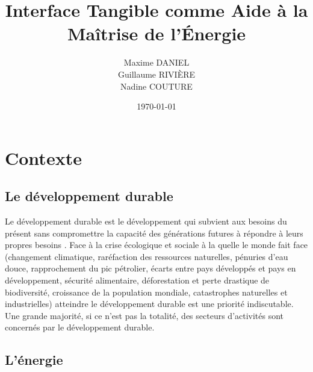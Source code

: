 \documentclass[10pt,a5paper,twoside]{article}
\title{Interface Tangible comme Aide à la Maîtrise de l'Énergie}
\author{Maxime DANIEL\\ Guillaume RIVIÈRE\\ Nadine COUTURE}
\date{\today}
\begin{document}
\maketitle
{}

\clearpage
\tableofcontents
\clearpage
\section{Contexte}\label{contexte}

\subsection{Le développement durable}\label{le-duxe9veloppement-durable}

Le développement durable est le développement qui subvient aux besoins
du présent sans compromettre la capacité des générations futures à
répondre à leurs propres besoins \citep{Hariem1985world}. Face à la
crise écologique et sociale à la quelle le monde fait face (changement
climatique, raréfaction des ressources naturelles, pénuries d'eau douce,
rapprochement du pic pétrolier, écarts entre pays développés et pays en
développement, sécurité alimentaire, déforestation et perte drastique de
biodiversité, croissance de la population mondiale, catastrophes
naturelles et industrielles) atteindre le développement durable est une
priorité indiscutable. Une grande majorité, si ce n'est pas la totalité,
des secteurs d'activités sont concernés par le développement durable.

\subsection{L'énergie}\label{luxe9nergie}
\end{document}

